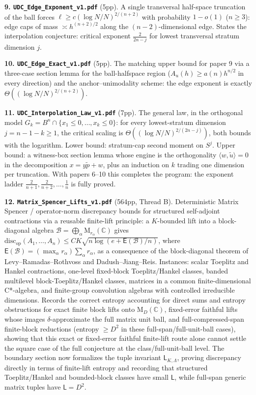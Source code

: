 \documentclass[11pt]{article}
\begin{document}
\textbf{9. \texttt{UDC\_Edge\_Exponent\_v1.pdf}} (5pp).
A single transversal half-space truncation of the ball forces
$\ell\ge c(\log N/N)^{2/(n+2)}$ with probability $1-o(1)$ ($n\ge3$): edge
caps of mass $\asymp h^{(n+2)/2}$ along the $(n-2)$-dimensional edge.  States
the interpolation conjecture: critical exponent $\frac{2}{2n-j}$ for lowest
transversal stratum dimension $j$.

\textbf{10. \texttt{UDC\_Edge\_Exact\_v1.pdf}} (5pp).
The matching upper bound for paper 9 via a three-case section lemma for the
ball-halfspace region ($A_u(h)\ge a(n)h^{n/2}$ in every direction) and the
anchor--unimodality scheme: the edge exponent is exactly
$\Theta((\log N/N)^{2/(n+2)})$.

\textbf{11. \texttt{UDC\_Interpolation\_Law\_v1.pdf}} (7pp).
The general law, in the orthogonal model
$G_k=B^n\cap\{x_1\le0,\dots,x_k\le0\}$: for every lowest-stratum dimension
$j=n-1-k\ge1$, the critical scaling is
$\Theta((\log N/N)^{2/(2n-j)})$, both bounds with the logarithm.  Lower bound:
stratum-cap second moment on $S^j$.  Upper bound: a witness-box section lemma
whose engine is the orthogonality $\langle w,\tilde u\rangle=0$ in the
decomposition $x=y\tilde p+w$, plus an induction on $k$ trading one dimension
per truncation.  With papers 6--10 this completes the program: the exponent
ladder $\frac2{n+1},\frac2{n+2},\dots,\frac1n$ is fully proved.

\textbf{12. \texttt{Matrix\_Spencer\_Lifts\_v1.pdf}} (564pp, Thread B).
Deterministic Matrix Spencer / operator-norm discrepancy bounds for structured
self-adjoint contractions via a reusable finite-lift principle: a $K$-bounded
lift into a block-diagonal algebra
$\mathcal B=\bigoplus_\alpha\mathrm M_{r_\alpha}(\mathbb C)$ gives
$\mathrm{disc}_{\mathrm{op}}(A_1,\dots,A_n)\le
CK\sqrt{n\log(e+\mathsf E(\mathcal B)/n)}$, where
$\mathsf E(\mathcal B)=(\max_\alpha r_\alpha)\sum_\alpha r_\alpha$, as a
consequence of the block-diagonal theorem of Levy--Ramadas--Rothvoss and
Dadush--Jiang--Reis.  Instances:
scalar Toeplitz and Hankel contractions, one-level fixed-block
Toeplitz/Hankel classes, banded multilevel block-Toeplitz/Hankel classes,
matrices in a common finite-dimensional C*-algebra, and finite-group
convolution algebras with controlled irreducible dimensions.  Records the
correct entropy accounting for direct sums and entropy obstructions for exact
finite block lifts onto \(\mathrm M_D(\mathbb C)\), fixed-error faithful lifts
whose images \(\delta\)-approximate the full matrix unit ball, and
full-compressed-span finite-block reductions (entropy \(\ge D^2\) in these
full-span/full-unit-ball cases), showing that this exact or fixed-error
faithful finite-lift route alone cannot settle the square case of the full
conjecture at the class/full-unit-ball level.  The boundary section now
formalizes the tuple invariant \(\mathsf L_{K,\Lambda}\), proving discrepancy
directly in terms of finite-lift entropy and recording that structured
Toeplitz/Hankel and bounded-block classes have small \(\mathsf L\), while
full-span generic matrix tuples have \(\mathsf L=D^2\).
\end{document}
